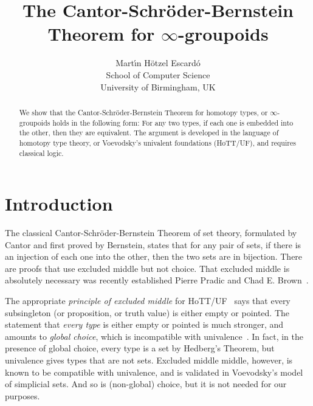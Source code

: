\documentclass{article}
\title{The Cantor-Schr\"oder-Bernstein Theorem for $\infty$-groupoids}
\author{Mart\'{\i}n H\"otzel Escard\'o \\ School of Computer Science \\ University of Birmingham, UK}
\theoremstyle{definition}
\begin{document}
\maketitle

\begin{abstract}
  We show that the Cantor-Schr\"oder-Bernstein Theorem for homotopy
  types, or $\infty$-groupoids holds in the following form: For any
  two types, if each one is embedded into the other, then they are
  equivalent. The argument is developed in the language of homotopy
  type theory, or Voevodsky's univalent foundations (HoTT/UF), and
  requires classical logic.
\end{abstract}

\section{Introduction}

The classical Cantor-Schr\"oder-Bernstein Theorem of set theory, formulated by Cantor and first proved by Bernstein, states that for any pair of sets, if there is an injection of each one into the other, then the two sets are in bijection.
%
There are proofs that use excluded middle but not choice. That excluded middle is absolutely necessary was recently established Pierre Pradic and Chad E. Brown~\cite{pradic:brown}.

The appropriate \emph{principle of excluded middle} for HoTT/UF~\cite{hottbook} says that every subsingleton (or proposition, or truth value) is either empty or pointed. The statement that \emph{every type} is either empty or pointed is much stronger, and amounts to \emph{global choice}, which is incompatible with univalence~\cite[Theorem 3.2.2]{hottbook}. In fact, in the presence of global choice, every type is a set by Hedberg's Theorem, but univalence gives types that are not sets. Excluded middle middle, however, is known to be compatible with univalence, and is validated in Voevodsky's model of simplicial sets. And so is (non-global) choice, but it is not needed for our purposes.
\end{document}
